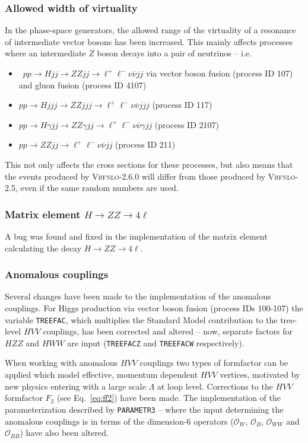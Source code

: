 \documentclass[english,12pt]{article}
\begin{document}
\subsubsection{Allowed width of virtuality}
In the phase-space generators, the allowed range of the virtuality of a resonance of intermediate vector bosons has been increased.  This mainly affects processes where an intermediate $Z$ boson decays into a pair of neutrinos -- i.e.
\begin{itemize}
 \item \ $pp \rightarrow Hjj \rightarrow ZZjj \rightarrow \ell^{+} \ell^{-} \nu \overline{\nu} jj$ via vector boson fusion (process ID 107) and gluon fusion (process ID 4107)
 \item $pp \rightarrow Hjjj \rightarrow ZZjjj \rightarrow \ell^{+} \ell^{-} \nu \overline{\nu} jjj$ (process ID 117)
 \item $pp \rightarrow H\gamma jj \rightarrow ZZ\gamma jj \rightarrow \ell^{+} \ell^{-} \nu \overline{\nu} \gamma jj$ (process ID 2107)
 \item $pp \rightarrow ZZjj \rightarrow \ell^{+} \ell^{-} \nu \overline{\nu} jj$ (process ID 211)
\end{itemize}
This not only affects the cross sections for these processes, but also means that the events produced by \textsc{Vbfnlo-2.6.0} will differ from those produced by \textsc{Vbfnlo-2.5}, even if the same random numbers are used.

\subsubsection{Matrix element $H \rightarrow ZZ \rightarrow 4\ell$}
A bug was found and fixed in the implementation of the matrix element
calculating the decay $H \rightarrow ZZ \rightarrow 4\ell$.  

\subsubsection{Anomalous couplings}
Several changes have been made to the implementation of the anomalous couplings.  For Higgs production via vector boson fusion (process IDs 100-107) the variable {\tt TREEFAC}, which multiplies the Standard Model contribution to the tree-level $HVV$ couplings, has been corrected and altered -- now, separate factors for $HZZ$ and $HWW$ are input ({\tt TREEFACZ} and {\tt TREEFACW} respectively). 

When working with anomalous $HVV$ couplings two types of formfactor can be applied which model effective, momentum dependent $HVV$ vertices, motivated by new physics entering with a large scale $\Lambda$ at loop level.  Corrections to the $HVV$ formfactor $F_{2}$ (see Eq.~\ref{eq:ff2}) have been made.   The implementation of the parameterization described by {\tt PARAMETR3} -- where the input determining the anomalous couplings is in terms of the dimension-6 operators ($\mathcal{O}_{W}$, $\mathcal{O}_{B}$, $\mathcal{O}_{WW}$ and $\mathcal{O}_{BB}$) have also been altered. 
\end{document}
